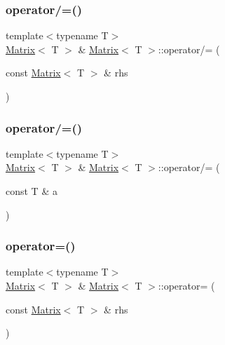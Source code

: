 \subsubsection{\texorpdfstring{operator/=()}{operator/=()}\hspace{0.1cm}{\footnotesize\ttfamily [1/2]}}
{\footnotesize\ttfamily template$<$typename T$>$ \\
\mbox{\hyperlink{classMatrix}{Matrix}}$<$ T $>$ \& \mbox{\hyperlink{classMatrix}{Matrix}}$<$ T $>$\+::operator/= (\begin{DoxyParamCaption}\item[{const \mbox{\hyperlink{classMatrix}{Matrix}}$<$ T $>$ \&}]{rhs }\end{DoxyParamCaption})\hspace{0.3cm}{\ttfamily [inline]}}

\mbox{\label{classMatrix_ada3039797826038262e03da2ee3a8697_ada3039797826038262e03da2ee3a8697}} 
\subsubsection{\texorpdfstring{operator/=()}{operator/=()}\hspace{0.1cm}{\footnotesize\ttfamily [2/2]}}
{\footnotesize\ttfamily template$<$typename T$>$ \\
\mbox{\hyperlink{classMatrix}{Matrix}}$<$ T $>$ \& \mbox{\hyperlink{classMatrix}{Matrix}}$<$ T $>$\+::operator/= (\begin{DoxyParamCaption}\item[{const T \&}]{a }\end{DoxyParamCaption})\hspace{0.3cm}{\ttfamily [inline]}}

\mbox{\label{classMatrix_a01990eb2552555d37c83272125be68e6_a01990eb2552555d37c83272125be68e6}} 
\subsubsection{\texorpdfstring{operator=()}{operator=()}\hspace{0.1cm}{\footnotesize\ttfamily [1/2]}}
{\footnotesize\ttfamily template$<$typename T$>$ \\
\mbox{\hyperlink{classMatrix}{Matrix}}$<$ T $>$ \& \mbox{\hyperlink{classMatrix}{Matrix}}$<$ T $>$\+::operator= (\begin{DoxyParamCaption}\item[{const \mbox{\hyperlink{classMatrix}{Matrix}}$<$ T $>$ \&}]{rhs }\end{DoxyParamCaption})\hspace{0.3cm}{\ttfamily [inline]}}

